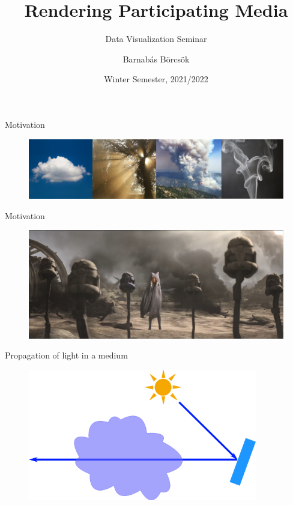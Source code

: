 \documentclass[
  english,            %
  aspectratio=169,    %
]{tumbeamer}
\title{Rendering Participating Media}
\subtitle{Data Visualization Seminar}
\author{Barnabás Börcsök}
\institute{\theChairName\\\theDepartmentName\\\theUniversityName}
\date[WS 2021/2022]{Winter Semester, 2021/2022}
\begin{document}
\maketitle

\begin{frame}{Motivation}
  \begin{figure}
      \centering
      \includegraphics{img/teaser.png}
      \label{fig:teaser}
  \end{figure}
\end{frame}


\begin{frame}{Motivation}
  \begin{figure}
      \centering
      \includegraphics[width=\textwidth]{img/ahsoka-smoke.png}
      \label{fig:teaser}
  \end{figure}
\end{frame}

\begin{frame}{Propagation of light in a medium}
    \begin{figure}[ht]
        \centering
        \def\svgwidth{\columnwidth}
        \includegraphics[width=10cm]{img/propagation-illustration.png}
    \end{figure}
\end{frame}
\end{document}
